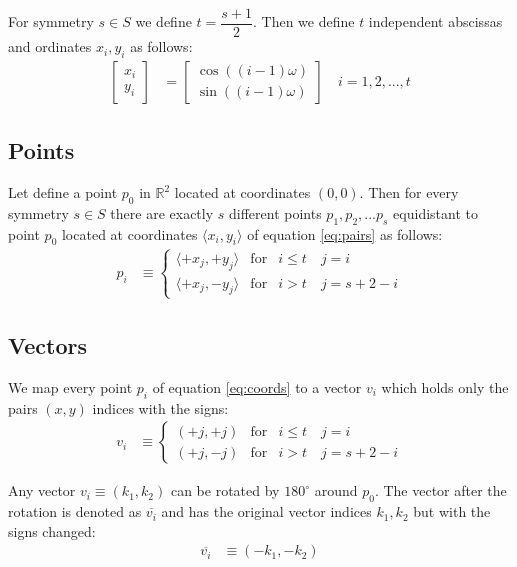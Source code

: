 \documentclass[11pt]{article}
\begin{document}
For symmetry $s \in S$ we define $t = \dfrac{s+1}2$. Then we define $t$ independent abscissas and ordinates $x_i, y_i$ as follows:
\begin{align}
\left[ \begin{array}{c} x_i \\ y_i \end{array} \right] &= 
\left[ \begin{array}{c} \cos((i-1)\omega) \\ \sin((i-1)\omega) \end{array} \right]
 \quad i = 1,2,...,t \label{eq:pairs}
\end{align}

\subsection{Points}

Let define a point $p_0$ in $\mathbb{R}^2$ located at coordinates $(0,0)$. Then for every symmetry $s \in S$ there are exactly $s$ different points $p_1, p_2, ... p_s$  equidistant to point $p_0$ located at coordinates $\langle x_i,y_i \rangle$ of equation \ref{eq:pairs} as follows:
\begin{align}
p_i &\equiv \left\{ \begin{array}{ccl}
 \langle +x_j, +y_j\rangle & \mbox{for} & i \leq t  \quad j = i\\
 \langle +x_j, -y_j\rangle & \mbox{for} & i > t \quad j = s+2-i
 \end{array}\right. \label{eq:coords}
\end{align}

\subsection{Vectors}

We map every point $p_i$ of equation \ref{eq:coords} to a vector $v_i$ which holds only the pairs $(x,y)$ indices with the signs:
\begin{align}
v_i &\equiv \left\{ \begin{array}{ccl}
 ( +j, +j ) & \mbox{for} & i \leq t \quad j = i\\
 ( +j, -j ) & \mbox{for} & i > t \quad j = s+2-i
 \end{array}\right. \label{eq:vectors}
\end{align}

Any vector $v_i \equiv (k_1,k_2)$ can be rotated by $180^\circ$ around $p_0$. The vector after the rotation is denoted as $\overline{v_i}$ and has the original vector indices $k_1,k_2$ but with the signs changed:
\begin{align}
\overline{v_i} &\equiv (-k_1, -k_2) \label{eq:vector180}
\end{align}
\end{document}
